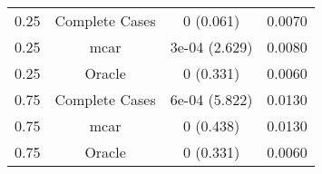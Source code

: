 \begin{table}[ht]
\centering
\begin{tabular}{cccc}
  \hline
  \hline
0.25 & Complete Cases & 0 (0.061) & 0.0070 \\ 
  0.25 & mcar & 3e-04 (2.629) & 0.0080 \\ 
  0.25 & Oracle & 0 (0.331) & 0.0060 \\ 
  0.75 & Complete Cases & 6e-04 (5.822) & 0.0130 \\ 
  0.75 & mcar & 0 (0.438) & 0.0130 \\ 
  0.75 & Oracle & 0 (0.331) & 0.0060 \\ 
   \hline
\end{tabular}
\end{table}
